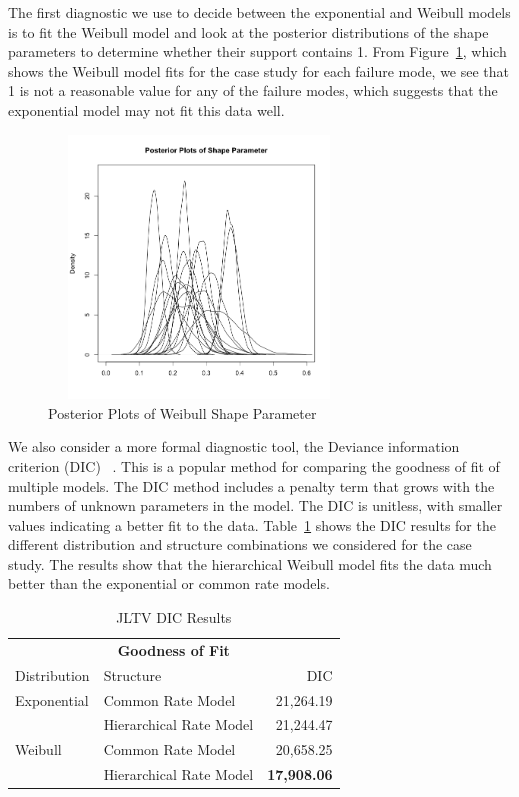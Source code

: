 \documentclass[12pt]{article}
\begin{document}
The first diagnostic we use to decide between the exponential and Weibull models is
to fit the Weibull model and look at the posterior distributions of the shape
parameters to determine whether their support contains 1. From Figure~\ref{Shape}, which shows the Weibull model fits for the case study for each failure mode, we see that 1 is not a reasonable value for any of the failure modes, which suggests that the exponential model may not fit this data well.

\begin{figure}[h]
  \centering
      \includegraphics[width=8cm, height=7cm]{shapePostPlot}
  \caption{Posterior Plots of Weibull Shape Parameter}
  \label{Shape}
\end{figure}

We also consider a more formal diagnostic tool, the Deviance information criterion (DIC)
~\cite{ref5}. This is a popular method for comparing the goodness of fit of
multiple models. The DIC method includes a penalty term that grows with the
numbers of unknown parameters in the model.  The DIC is unitless, with smaller values indicating a better fit to the data.  Table~\ref{table:ta1} shows the DIC results for the different distribution and structure combinations we considered for the case study. The results show that the hierarchical Weibull model fits the data much better than the exponential or common rate models.

\begin{table}[h]
\centering
\begin{tabular}{|l|l|r|}
\multicolumn{3}{c}{\textbf{Goodness of Fit}} \\
\cline{1-3}
Distribution    & Structure & DIC \\
\hline
Exponential   & Common Rate Model                     & 21,264.19             \\
              & Hierarchical Rate Model               & 21,244.47             \\
Weibull       & Common Rate Model                     & 20,658.25             \\
              & Hierarchical Rate Model               & \textbf{17,908.06}    \\
\hline
\end{tabular}
\caption{JLTV DIC Results}
\label{table:ta1}
\end{table}
\end{document}

